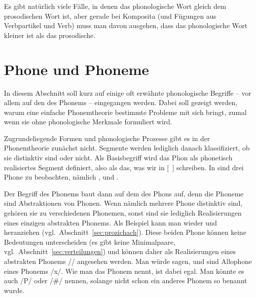 Es gibt natürlich viele Fälle, in denen das phonologische Wort gleich dem prosodischen Wort ist, aber gerade bei Komposita (und \zB Fügungen aus Verbpartikel und Verb) muss man davon ausgehen, dass das phonologische Wort kleiner ist als das prosodische.







\section[Phone und Phoneme]{\Opsional Phone und Phoneme}

\label{sec:phonphonem}

In diesem Abschnitt soll kurz auf einige oft erwähnte phonologische Begriffe -- vor allem auf den des Phonems -- eingegangen werden.
Dabei soll gezeigt werden, warum eine einfache Phonemtheorie bestimmte Probleme mit sich bringt, zumal wenn sie ohne phonologische Merkmale formuliert wird.

Zugrundeliegende Formen und phonologische Prozesse gibt es in der Phonemtheorie zunächst nicht.
Segmente werden lediglich danach klassifiziert, ob sie distinktiv sind oder nicht.
Als Basisbegriff wird das Phon als phonetisch realisiertes Segment definiert, also als das, was wir in [~] schreiben.
In \textipa{[ta:k]} sind drei Phone zu beobachten, nämlich \textipa{[t]}, \textipa{[a:]} und \textipa{[k]}.


Der Begriff des Phonems baut dann auf dem des Phons auf, denn die Phoneme sind Abstraktionen von Phonen.
Wenn nämlich mehrere Phone distinktiv sind, gehören sie zu verschiedenen Phonemen, sonst sind sie lediglich Realisierungen eines einzigen abstrakten Phonems.
Als Beispiel kann man wieder \textipa{[\c{c}]} und \textipa{[X]} heranziehen (vgl.\ Abschnitt~\ref{sec:prozichach}).
Diese beiden Phone können keine Bedeutungen unterscheiden (es gibt keine Minimalpaare, vgl.\ Abschnitt~\ref{sec:verteilungen}) und können daher als Realisierungen eines abstrakten Phonems // angesehen werden.
Man würde sagen, \textipa{[\c{c}]} und \textipa{[X]} sind Allophone eines Phonems /x/.
Wie man das Phonem nennt, ist dabei egal.
Man könnte es auch /P/ oder /\#/ nennen, solange nicht schon ein anderes Phonem so benannt wurde.

